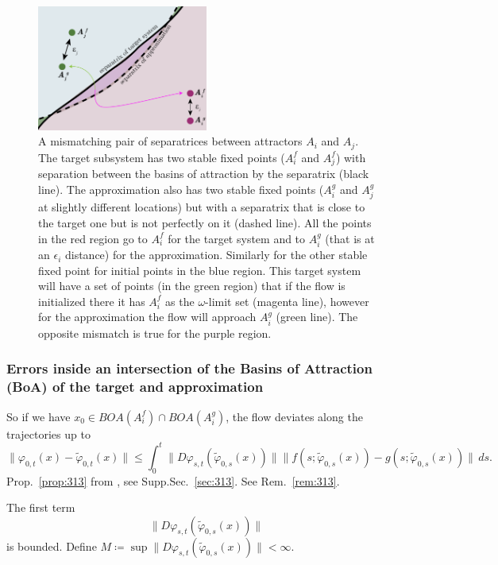 \documentclass{article}
\theoremstyle{definition}
\theoremstyle{remark}
\newcounter{ct}
\begin{document}
\setlength\belowcaptionskip{-1ex}
\begin{figure}
  \centering
  \includegraphics[width=0.5\textwidth]{separatrices}
  \caption{
	A mismatching pair of separatrices between attractors $A_i$ and $A_j$.
	The target subsystem has two stable fixed points ($A_i^f$ and $A_j^f$) with separation between the basins of attraction by the separatrix (black line).
	The approximation also has two stable fixed points ($A_i^g$ and $A_j^g$ at slightly different locations) but with a separatrix that is close to the target one but is not perfectly on it (dashed line).
	All the points in the red region go to $A_i^f$ for the target system and to $A_i^g$ (that is at an $\epsilon_i$ distance) for the approximation. Similarly for the other stable fixed point for initial points in the blue region.
	This target system will have a set of points (in the green region) that if the flow is initialized there it has $A_i^f$ as the $\omega$-limit set (magenta line), however for the approximation the flow will approach $A_i^g$ (green line).
	The opposite mismatch is true for the purple region.
  }\label{fig:separatrices}
\end{figure}

\subsubsection{Errors inside an intersection of the Basins of Attraction (BoA) of the target and approximation}
So if we have $x_0\in BOA(A_i^f) \cap BOA(A_i^g)$, the flow deviates along the trajectories up to 
\[
\|\varphi_{0,t}(x) - \tilde{\varphi}_{0,t}(x)\| \leq \int_0^t \|D\varphi_{s,t}(\tilde{\varphi}_{0,s}(x))\| \|f(s; \tilde{\varphi}_{0,s}(x)) - g(s; \tilde{\varphi}_{0,s}(x))\| \, ds.
\]
Prop.~\ref{prop:313} from \citep{vanhandel2007filtering}, see Supp.Sec.~\ref{sec:313}.
%
See Rem.~\ref{rem:313}.

The first term \[\|D\varphi_{s,t}(\tilde{\varphi}_{0,s}(x))\|\]
is bounded. %
Define $M\coloneqq \sup \|D\varphi_{s,t}(\tilde{\varphi}_{0,s}(x))\|<\infty$. 
\end{document}
